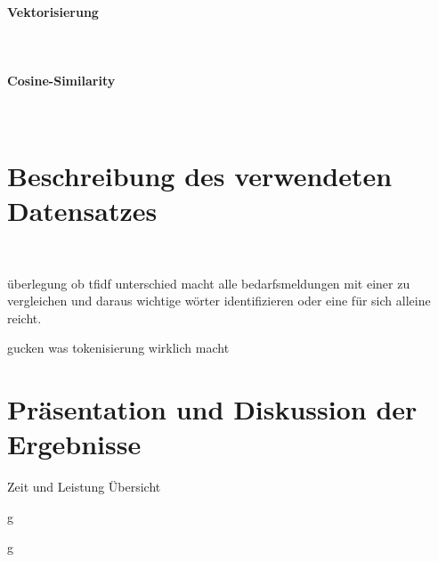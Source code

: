 \paragraph{Vektorisierung}\mbox{}\\

\paragraph{Cosine-Similarity}\mbox{}\\

\section{Beschreibung des verwendeten Datensatzes}
\\
\newpage

überlegung ob tfidf unterschied macht alle bedarfsmeldungen mit einer zu vergleichen und daraus wichtige wörter identifizieren oder eine für sich alleine reicht.

gucken was tokenisierung wirklich macht
\section{Präsentation und Diskussion der Ergebnisse}
Zeit und Leistung Übersicht
\newpage

g
\newpage

g
\newpage